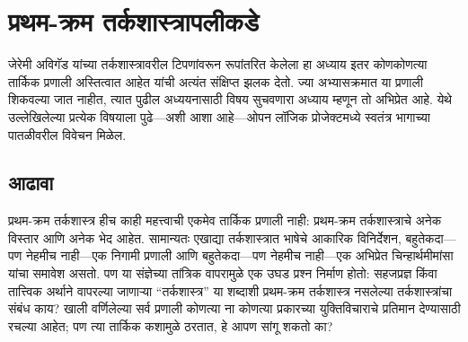 \chapter{प्रथम-क्रम तर्कशास्त्रापलीकडे}\label{fol:byd::chap}
\begin{editorial}
  जेरेमी अविगॅड यांच्या तर्कशास्त्रावरील टिपणांवरून रूपांतरित केलेला हा
  अध्याय इतर कोणकोणत्या तार्किक प्रणाली अस्तित्वात आहेत यांची अत्यंत संक्षिप्त
  झलक देतो. ज्या अभ्यासक्रमात या प्रणाली शिकवल्या जात नाहीत, त्यात पुढील
  अध्ययनासाठी विषय सुचवणारा अध्याय म्हणून तो अभिप्रेत आहे. येथे उल्लेखिलेल्या
  प्रत्येक विषयाला पुढे---अशी आशा आहे---ओपन लॉजिक प्रोजेक्टमध्ये स्वतंत्र
  भागाच्या पातळीवरील विवेचन मिळेल.
\end{editorial}









\section{आढावा}\label{fol:byd:int:sec}

प्रथम-क्रम तर्कशास्त्र हीच काही महत्त्वाची एकमेव तार्किक प्रणाली नाही:
प्रथम-क्रम तर्कशास्त्राचे अनेक विस्तार आणि अनेक भेद आहेत. सामान्यतः एखाद्या
तर्कशास्त्रात भाषेचे आकारिक विनिर्देशन, बहुतेकदा---पण नेहमीच नाही---एक
निगामी प्रणाली आणि बहुतेकदा---पण नेहमीच नाही---एक अभिप्रेत चिन्हार्थमीमांसा
यांचा समावेश असतो. पण या संज्ञेच्या तांत्रिक वापरामुळे एक उघड प्रश्न निर्माण
होतो: सहजप्रज्ञ किंवा तात्त्विक अर्थाने वापरल्या जाणाऱ्या ``तर्कशास्त्र'' या
शब्दाशी प्रथम-क्रम तर्कशास्त्र नसलेल्या तर्कशास्त्रांचा संबंध काय? खाली
वर्णिलेल्या सर्व प्रणाली कोणत्या ना कोणत्या प्रकारच्या युक्तिविचाराचे प्रतिमान
देण्यासाठी रचल्या आहेत; पण त्या तार्किक कशामुळे ठरतात, हे आपण सांगू शकतो का?

